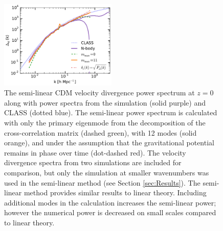 \documentclass[twocolumn,superscriptaddress,prd]{revtex4}
\begin{document}

\begin{figure}[h!]
  \centering
    \includegraphics[width=0.495\textwidth]{Figures/vel_cdm_0.pdf}
    \caption{The semi-linear CDM velocity divergence
      power spectrum at $z=0$ along with 
      power spectra from the simulation (solid purple) and
      CLASS (dotted blue). The semi-linear power spectrum is calculated with only the primary
eigenmode from the decomposition of the cross-correlation matrix
(dashed green), with 12 modes (solid orange), and under the assumption
that the gravitational potential remains in phase over time
(dot-dashed red).  The velocity divergence spectra from two
    simulations are included for comparison, but only the simulation
    at smaller wavenumbers was used in the semi-linear method (see
    Section \ref{sec:Results}).  
    The semi-linear method 
    provides similar results to linear theory.  Including
    additional modes in the calculation increases the semi-linear
    power; however the
    numerical power is decreased on small scales compared to linear
    theory. 
}
    \label{fig:vel_cdm_rec}
\end{figure}
\end{document}
